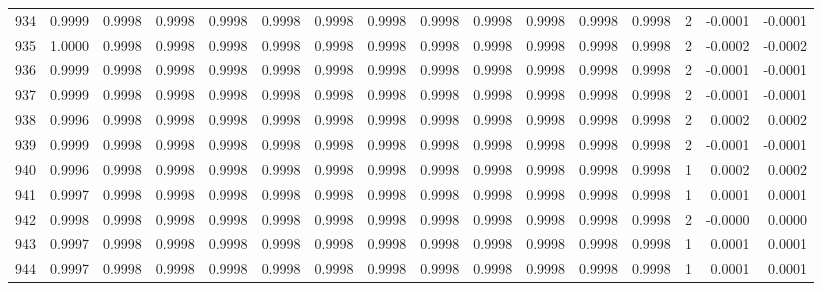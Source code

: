 \begin{tabular}{lrrrrrrrrrrrrrrr}
934 &      0.9999 &  0.9998 &  0.9998 &  0.9998 &  0.9998 &  0.9998 &  0.9998 &  0.9998 &  0.9998 &  0.9998 &   0.9998 &     0.9998 &      2 &                   -0.0001 &                    -0.0001 \\
935 &      1.0000 &  0.9998 &  0.9998 &  0.9998 &  0.9998 &  0.9998 &  0.9998 &  0.9998 &  0.9998 &  0.9998 &   0.9998 &     0.9998 &      2 &                   -0.0002 &                    -0.0002 \\
936 &      0.9999 &  0.9998 &  0.9998 &  0.9998 &  0.9998 &  0.9998 &  0.9998 &  0.9998 &  0.9998 &  0.9998 &   0.9998 &     0.9998 &      2 &                   -0.0001 &                    -0.0001 \\
937 &      0.9999 &  0.9998 &  0.9998 &  0.9998 &  0.9998 &  0.9998 &  0.9998 &  0.9998 &  0.9998 &  0.9998 &   0.9998 &     0.9998 &      2 &                   -0.0001 &                    -0.0001 \\
938 &      0.9996 &  0.9998 &  0.9998 &  0.9998 &  0.9998 &  0.9998 &  0.9998 &  0.9998 &  0.9998 &  0.9998 &   0.9998 &     0.9998 &      2 &                    0.0002 &                     0.0002 \\
939 &      0.9999 &  0.9998 &  0.9998 &  0.9998 &  0.9998 &  0.9998 &  0.9998 &  0.9998 &  0.9998 &  0.9998 &   0.9998 &     0.9998 &      2 &                   -0.0001 &                    -0.0001 \\
940 &      0.9996 &  0.9998 &  0.9998 &  0.9998 &  0.9998 &  0.9998 &  0.9998 &  0.9998 &  0.9998 &  0.9998 &   0.9998 &     0.9998 &      1 &                    0.0002 &                     0.0002 \\
941 &      0.9997 &  0.9998 &  0.9998 &  0.9998 &  0.9998 &  0.9998 &  0.9998 &  0.9998 &  0.9998 &  0.9998 &   0.9998 &     0.9998 &      1 &                    0.0001 &                     0.0001 \\
942 &      0.9998 &  0.9998 &  0.9998 &  0.9998 &  0.9998 &  0.9998 &  0.9998 &  0.9998 &  0.9998 &  0.9998 &   0.9998 &     0.9998 &      2 &                   -0.0000 &                     0.0000 \\
943 &      0.9997 &  0.9998 &  0.9998 &  0.9998 &  0.9998 &  0.9998 &  0.9998 &  0.9998 &  0.9998 &  0.9998 &   0.9998 &     0.9998 &      1 &                    0.0001 &                     0.0001 \\
944 &      0.9997 &  0.9998 &  0.9998 &  0.9998 &  0.9998 &  0.9998 &  0.9998 &  0.9998 &  0.9998 &  0.9998 &   0.9998 &     0.9998 &      1 &                    0.0001 &                     0.0001 \\

\end{tabular}

